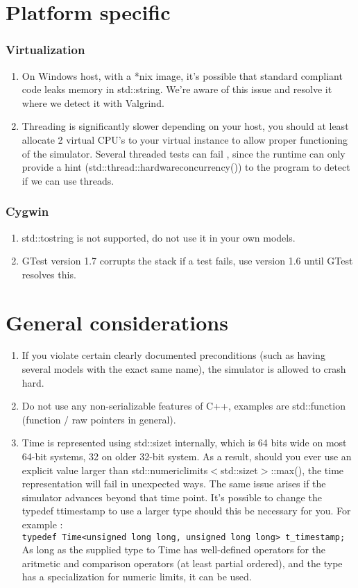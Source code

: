 
\section{Platform specific}
\subsubsection{Virtualization}
\begin{enumerate}
\item On Windows host, with a *nix image, it's possible that standard compliant code leaks memory in std::string. We're aware of this issue and resolve it where we detect it with Valgrind.
\item Threading is significantly slower depending on your host, you should at least allocate 2 virtual CPU's to your virtual instance to allow proper functioning of the simulator. Several threaded tests can fail , since the runtime can only provide a hint (std::thread::hardware\textunderscore concurrency()) to the program to detect if we can use threads.
\end{enumerate}
\subsubsection{Cygwin}
\begin{enumerate}
\item std::to\textunderscore string is not supported, do not use it in your own models.
\item GTest version 1.7 corrupts the stack if a test fails, use version 1.6 until GTest resolves this.
\end{enumerate}
\section{General considerations}
\begin{enumerate}
\item If you violate certain clearly documented preconditions (such as having several models with the exact same name), the simulator is allowed to crash hard.
\item Do not use any non-serializable features of C++, examples are std::function (function / raw pointers in general).
\item Time is represented using std::size\textunderscore t internally, which is 64 bits wide on most 64-bit systems, 32 on older 32-bit system. As a result, should you ever use an explicit value larger than std::numeric\textunderscore limits$<$std::size\textunderscore t$>$::max(), the time representation will fail in unexpected ways. The same issue arises if the simulator advances beyond that time point. It's possible to change the typedef t\textunderscore timestamp to use a larger type should this be necessary for you. For example :\\
\lstinline!typedef Time<unsigned long long, unsigned long long> t_timestamp;!
As long as the supplied type to Time has well-defined operators for the aritmetic and comparison operators (at least partial ordered), and the type has a specialization for numeric limits, it can be used.
\end{enumerate}
